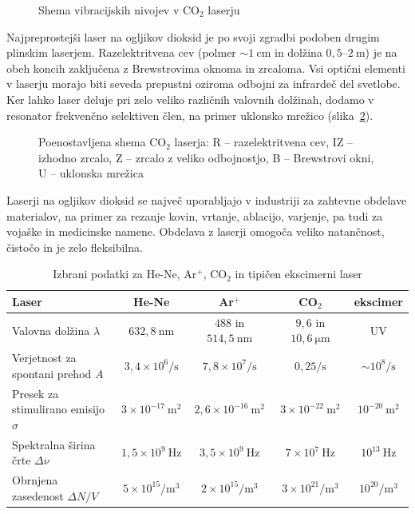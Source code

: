\begin{figure}[h]
\centering
\def\svgwidth{95truemm} 

\caption{Shema vibracijskih nivojev v CO$_2$ laserju}
\label{fig:CO2E}
\end{figure}

Najpreprostejši laser na ogljikov dioksid  
je po svoji zgradbi podoben drugim plinskim laserjem. 
Razelektritvena cev (polmer $\sim 1~\si{\centi\metre}$ in dolžina $0,5$--$2~\si{\metre}$) 
je na obeh koncih zaključena z Brewstrovima oknoma in zrcaloma. Vsi optični elementi
v laserju morajo biti seveda prepustni oziroma odbojni za infrardeč del svetlobe. Ker lahko 
laser deluje pri zelo veliko različnih valovnih dolžinah, dodamo v resonator frekvenčno selektiven
člen, na primer uklonsko mrežico (slika~\ref{fig:CO2S}).

\begin{figure}[h]
\centering
\def\svgwidth{110truemm} 

\caption{Poenostavljena shema  CO$_2$ laserja: R -- razelektritvena cev, 
IZ -- izhodno zrcalo, Z -- zrcalo z veliko odbojnostjo, B -- Brewstrovi okni, 
U -- uklonska mrežica
}
\label{fig:CO2S}
\end{figure}

Laserji na ogljikov dioksid se največ uporabljajo v industriji za zahtevne 
obdelave materialov, na primer za rezanje 
kovin, vrtanje, ablacijo, varjenje, pa tudi za vojaške in medicinske namene.
Obdelava z laserji omogoča veliko natančnost, čistočo in je zelo fleksibilna.

\begin{table}
\small
\begin{center}
\begin{tabular}{|l|c|c|c|c|}\hline
Laser & He-Ne & Ar$^+$ & CO$_2$ & ekscimer\\ \hline
Valovna dolžina  $\lambda$ & $632,8~\si{\nano\metre}$& $488$ in
$514,5~\si{\nano\metre}$ & $9,6$ in $10,6~\si{\micro\metre}$ & UV
\\ \hline
Verjetnost za spontani prehod $A$ & $3,4 \times 10^6/\si{\second}$ & 
$7,8 \times 10^7/\si{\second}$ & $0,25/\si{\second}$ & $\sim 10^8/\si{\second}$ \\ \hline
Presek za stimulirano emisijo $\sigma$ & $3 \times 10^{-17}~\si{\metre}^2$&  $2,6 \times 10^{-16}~\si{\metre}^2$ & $3 \times 10^{-22}~\si{\metre}^2$ & $ 10^{-20}~\si{\metre}^2$ \\ \hline
Spektralna širina črte $\Delta \nu$ & $1,5 \times 10^{9}~\si{\hertz}$ & 
$3,5 \times 10^{9}~\si{\hertz}$ &$7 \times 10^{7}~\si{\hertz}$ & $10^{13}~\si{\hertz}$ \\ \hline
Obrnjena zasedenost $\Delta N/V$ & $5 \times 10^{15}/\si{\metre}^3$ & $2 \times 10^{15}/\si{\metre}^3$ & $3 \times 10^{21}/\si{\metre}^3$ & $10^{20}/\si{\metre}^3$\\ \hline
\end{tabular}
\caption{Izbrani podatki za He-Ne, Ar$^+$, CO$_2$ in tipičen ekscimerni laser}
\label{tab:Ar}
\end{center}
\end{table}

